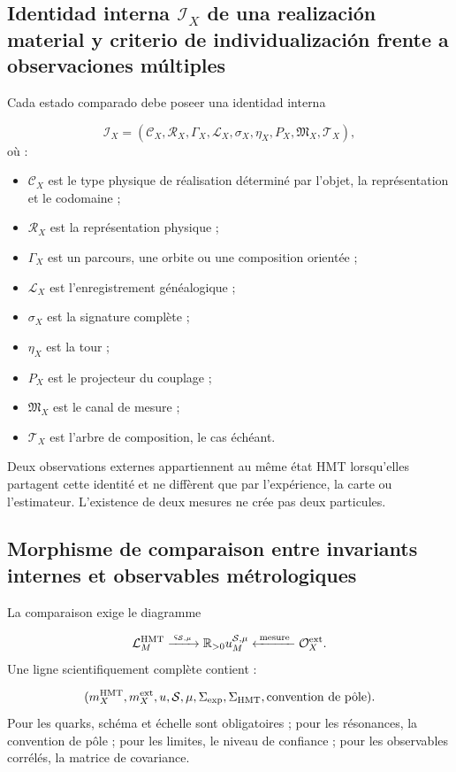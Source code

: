 \subsection{Identidad interna \(\mathcal I_X\) de una realización material y criterio de individualización frente a observaciones múltiples}
Cada estado comparado debe poseer una identidad interna

\[
 \mathcal I_X=
 (\mathcal C_X,\mathcal R_X,\Gamma_X,\mathcal L_X,
 \sigma_X,\eta_X,P_X,\mathfrak M_X,\mathcal T_X),
\]
où :

\begin{itemize}
\item \(\mathcal C_X\) est le type physique de réalisation déterminé par l'objet, la représentation et le codomaine ;
\item \(\mathcal R_X\) est la représentation physique ;
\item \(\Gamma_X\) est un parcours, une orbite ou une composition orientée ;
\item \(\mathcal L_X\) est l'enregistrement généalogique ;
\item \(\sigma_X\) est la signature complète ;
\item \(\eta_X\) est la tour ;
\item \(P_X\) est le projecteur du couplage ;
\item \(\mathfrak M_X\) est le canal de mesure ;
\item \(\mathcal T_X\) est l'arbre de composition, le cas échéant.
\end{itemize}
Deux observations externes appartiennent au même état HMT lorsqu'elles partagent cette identité et ne diffèrent que par l'expérience, la carte ou l'estimateur. L'existence de deux mesures ne crée pas deux particules.

\subsection{Morphisme de comparaison entre invariants internes et observables métrologiques}
La comparaison exige le diagramme

\[
 \mathcal L_M^{\rm HMT}
 \xrightarrow{\;\varsigma_{\mathcal S,\mu}\;}
 \mathbb R_{>0}u_M^{\mathcal S,\mu}
 \xleftarrow{\;\text{mesure}\;}
 \mathcal O_X^{\rm ext}.
\]
Une ligne scientifiquement complète contient :

\[
 (m_X^{\rm HMT},m_X^{\rm ext},
 u,\mathcal S,\mu,\Sigma_{\rm exp},\Sigma_{\rm HMT},
 \text{convention de pôle}).
\]
Pour les quarks, schéma et échelle sont obligatoires ; pour les résonances, la convention de pôle ; pour les limites, le niveau de confiance ; pour les observables corrélés, la matrice de covariance.

